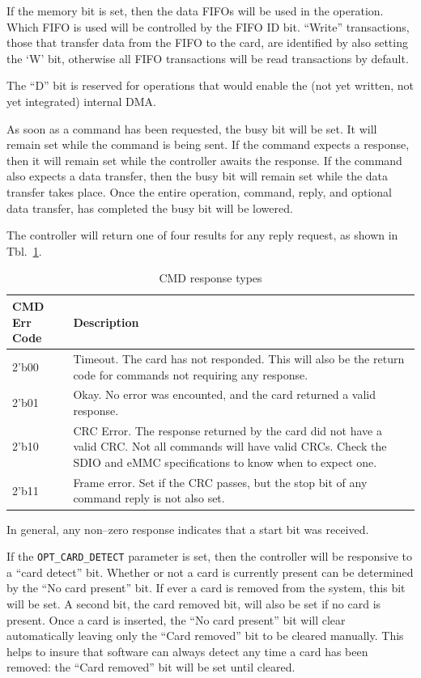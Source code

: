 \documentclass{gqtekspec}
\begin{document}
If the memory bit is set, then the data FIFOs will be used in the operation.
Which FIFO is used will be controlled by the FIFO ID bit.  ``Write''
transactions, those that transfer data from the FIFO to the card, are
identified by also setting the `W' bit, otherwise all FIFO transactions
will be read transactions by default.

The ``D'' bit is reserved for operations that would enable the (not yet
written, not yet integrated) internal DMA.

As soon as a command has been requested, the busy bit will be set.  It will
remain set while the command is being sent.  If the command expects a response,
then it will remain set while the controller awaits the response.  If the
command also expects a data transfer, then the busy bit will remain set while
the data transfer takes place.  Once the entire operation, command, reply,
and optional data transfer, has completed the busy bit will be lowered.

The controller will return one of four results for any reply request, as
shown in Tbl.~\ref{tbl:CMD-REPLY}.
\begin{table}\begin{center}
\begin{tabular}{|p{1.2in}|p{4.0in}|}\hline
	\rowcolor[gray]{0.85} CMD Err Code & Description\\\hline\hline
2'b00 & Timeout.  The card has not responded.  This will also be the
	return code for commands not requiring any response.\\
2'b01 & Okay.  No error was encounted, and the card returned a valid response.\\
2'b10 & CRC Error.  The response returned by the card did not have a valid
	CRC.  Not all commands will have valid CRCs.  Check the SDIO and eMMC
	specifications to know when to expect one.\\
2'b11 & Frame error.  Set if the CRC passes, but the stop bit of any command
	reply is not also set.
	\\\hline
\end{tabular}
\caption{CMD response types}\label{tbl:CMD-REPLY}
\end{center}\end{table}
In general, any non--zero response indicates that a start bit was received.

If the {\tt OPT\_CARD\_DETECT} parameter is set, then the controller will be
responsive to a ``card detect'' bit.  Whether or not a card is currently
present can be determined by the ``No card present'' bit.  If ever a card is
removed from the system, this bit will be set.  A second bit, the card removed
bit, will also be set if no card is present.  Once a card is inserted, the
``No card present'' bit will clear automatically leaving only the ``Card
removed'' bit to be cleared manually.  This helps to insure that software
can always detect any time a card has been removed: the ``Card removed'' bit
will be set until cleared.
\end{document}
